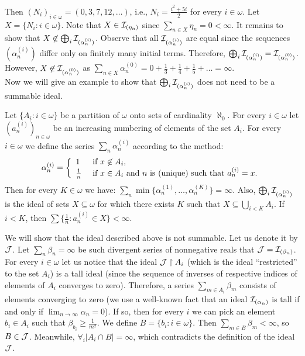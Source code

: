 \documentclass[12pt]{article}
\theoremstyle{plain}
\theoremstyle{definition}
\theoremstyle{remark}
\newcommand{\cI}{{\cal I}}
\newcommand{\cJ}{{\cal J}}
\begin{document}
Then $(N_i)_{i\in\omega} = (0, 3, 7, 12, \ldots )$, i.e., $N_i = \frac{i^2 + 5i}{2}$ for every $i\in\omega$.
Let $X= \{N_i \colon i\in\omega\}$. Note that $X \in \cI_{(\eta_n)}$ since $\sum_{n\in X} \eta_n = 0 < \infty$. 
It remains to show that $X\not\in\bigoplus_{i}\cI_{(\alpha_n^{(i)})}$. Observe that all $\cI_{(\alpha_n^{(i)})}$ are equal since the sequences $(\alpha_n^{(i)})$ differ only on finitely many initial terms. Therefore, $\bigoplus_{i}\cI_{(\alpha_n^{(i)})}= \cI_{(\alpha_n^{(0)})}$. However, $X\not\in\cI_{(\alpha_n^{(0)})}$ as $\sum_{n\in X} \alpha_n^{(0)} = 0 +\frac{1}{3} + \frac{1}{4} +\frac{1}{5} +\ldots = \infty$.\\


Now we will give an example to show that $\bigoplus_{i}\cI_{(\alpha_n^{(i)})}$ does not need to be a summable ideal.
	
Let $\{A_i\colon i\in\omega\}$ be a partition of $\omega$ onto sets of cardinality $\aleph_0$. For every $i\in\omega$ let $(a_n^{(i)})_{n\in\omega}$ be an increasing numbering 
of elements of the set $A_i$. For every $i\in\omega$ we define the series $\sum_n \alpha_n^{(i)}$ according to the method:
$$\alpha_n^{(i)} = 
\left\{
\begin{array}{ll}
1 & \hbox{\ if\ } x \not\in A_i,\\
\frac{1}{n} & \hbox{\ if\ } x \in A_i \hbox{{\ and\ }} n 
\hbox{{\ is\ (unique)\ such\ that\ }} a_n^{(i)} = x.
\end{array}
\right.$$
Then for every $K \in \omega$ we have: 
$\sum_n \min \{\alpha_n^{(1)}, \ldots, \alpha_n^{(K)}\} = \infty$.
Also, $\bigoplus_{i}\cI_{(\alpha_n^{(i)})}$ is the ideal of sets $X \subseteq \omega$ for which there exists $K$ such that $X \subseteq \bigcup_{i < K} A_i$.
If $i < K$, then $\sum \{\frac{1}{n} \colon a_n^{(i)} \in X\} < \infty$.

We will show that the ideal described above is not summable. Let us denote it by $\cJ$. Let $\sum_n \beta_n = \infty$ be such divergent series of nonnegative reals that $\cJ = \cI_{(\beta_n)}$. For every $i \in \omega$ let us notice that the ideal $\cJ \restriction A_i$ (which is the ideal ``restricted'' to the set $A_i$) is a tall ideal (since the sequence of inverses of respective indices of elements of $A_i$ converges to zero). Therefore, a series $\sum_{m\in A_i} \beta_m $ consists of elements converging to zero (we use a well-known fact that an ideal $\cI_{(\alpha_n)}$ is tall if and only if $\lim_{n\to\infty} \alpha_n = 0$).
If so, then for every $i$ we can pick an element $b_i \in A_i$ such that $\beta_{b_i} \geq \frac{1}{m^2}$. 
We define $B = \lbrace {b_i\colon i\in\omega} \rbrace$. Then $\sum_{m\in B} \beta_m < \infty$, so $B \in \cJ$. Meanwhile, $\forall_{i} |A_i \cap B| = \infty$, which contradicts the definition of the ideal $\cJ$.\\
\end{document}

